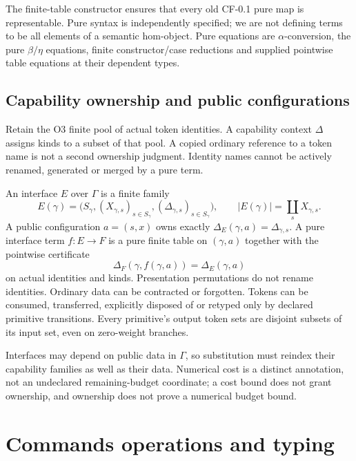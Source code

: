 \documentclass[11pt,a4paper]{article}
\theoremstyle{definition}
\begin{document}
The finite-table constructor ensures that every old CF-0.1 pure map is
representable. Pure syntax is independently specified; we are not defining
terms to be all elements of a semantic hom-object. Pure equations are
$\alpha$-conversion, the pure $\beta/\eta$ equations, finite constructor/case
reductions and supplied pointwise table equations at their dependent types.

\subsection{Capability ownership and public configurations}
Retain the O3 finite pool of actual token identities. A capability context
$\Delta$ assigns kinds to a subset of that pool. A copied ordinary reference
to a token name is not a second ownership judgment. Identity names cannot
be actively renamed, generated or merged by a pure term.

An interface $E$ over $\Gamma$ is a finite family
\[
 E(\gamma)=\bigl(S_\gamma,(X_{\gamma,s})_{s\in S_\gamma},
                         (\Delta_{\gamma,s})_{s\in S_\gamma}\bigr),
 \qquad |E(\gamma)|=\coprod_sX_{\gamma,s}.
\]
A public configuration $a=(s,x)$ owns exactly
$\Delta_E(\gamma,a)=\Delta_{\gamma,s}$. A pure interface term
$f:E\to F$ is a pure finite table on $(\gamma,a)$ together with the
pointwise certificate
\begin{equation}\label{eq:pure-tokens}
 \Delta_F(\gamma,f(\gamma,a))=\Delta_E(\gamma,a)
\end{equation}
on actual identities and kinds. Presentation permutations do not rename
identities. Ordinary data can be contracted or forgotten. Tokens can be
consumed, transferred, explicitly disposed of or retyped only by declared
primitive transitions. Every primitive's output token sets are disjoint
subsets of its input set, even on zero-weight branches.

Interfaces may depend on public data in $\Gamma$, so substitution must
reindex their capability families as well as their data. Numerical cost
is a distinct annotation, not an undeclared remaining-budget coordinate;
a cost bound does not grant ownership, and ownership does not prove a
numerical budget bound.

\section{Commands operations and typing}\label{sec:commands}
\end{document}
